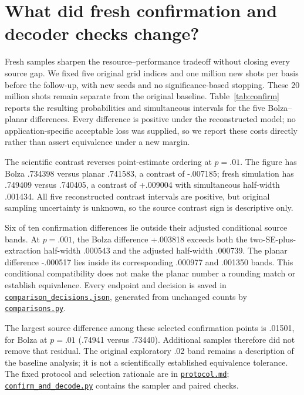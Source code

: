 \documentclass[11pt]{article}
\newcommand{\file}[2]{\href{https://github.com/alectionary/vibe-math/blob/master/formalization/higgott-quantum-decoding/#1}{\nolinkurl{#2}}}
\begin{document}
\section{What did fresh confirmation and decoder checks change?}
Fresh samples sharpen the resource--performance tradeoff without closing every source gap. We fixed five original grid indices and one million new shots per basis before the follow-up, with new seeds and no significance-based stopping. These 20 million shots remain separate from the original baseline. Table~\ref{tab:confirm} reports the resulting probabilities and simultaneous intervals for the five Bolza--planar differences. Every difference is positive under the reconstructed model; no application-specific acceptable loss was supplied, so we report these costs directly rather than assert equivalence under a new margin.

\begin{table}[ht]\centering\small

\caption{Fresh confirmation, one million shots per basis. Difference means Bolza minus four planar copies; half-widths use a normal approximation and Bonferroni correction over five differences. They describe our reconstructed models, not source uncertainty. Data: \file{revision2/followup_summary.json}{followup_summary.json}.}\label{tab:confirm}
\end{table}

The scientific contrast reverses point-estimate ordering at $p=.01$. The figure has Bolza .734398 versus planar .741583, a contrast of -.007185; fresh simulation has .749409 versus .740405, a contrast of +.009004 with simultaneous half-width .001434. All five reconstructed contrast intervals are positive, but original sampling uncertainty is unknown, so the source contrast sign is descriptive only.

Six of ten confirmation differences lie outside their adjusted conditional source bands. At $p=.001$, the Bolza difference +.003818 exceeds both the two-SE-plus-extraction half-width .000543 and the adjusted half-width .000739. The planar difference -.000517 lies inside its corresponding .000977 and .001350 bands. This conditional compatibility does not make the planar number a rounding match or establish equivalence. Every endpoint and decision is saved in \file{revision3/comparison_decisions.json}{comparison_decisions.json}, generated from unchanged counts by \file{revision3/comparisons.py}{comparisons.py}.

The largest source difference among these selected confirmation points is .01501, for Bolza at $p=.01$ (.74941 versus .73440). Additional samples therefore did not remove that residual. The original exploratory .02 band remains a description of the baseline analysis; it is not a scientifically established equivalence tolerance. The fixed protocol and selection rationale are in \file{revision2/protocol.md}{protocol.md}; \file{revision2/confirm_and_decode.py}{confirm_and_decode.py} contains the sampler and paired checks.
\end{document}
